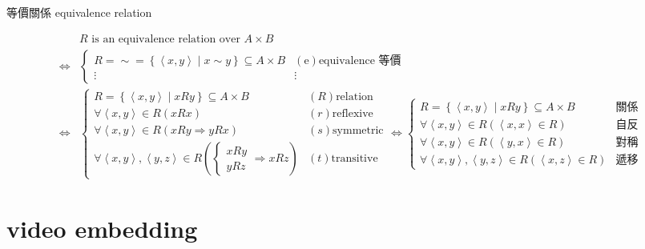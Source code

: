 \documentclass[
]{book}
\theoremstyle{definition}
\theoremstyle{definition}
\theoremstyle{definition}
\theoremstyle{definition}
\theoremstyle{remark}
\begin{document}
\begin{CJK}{UTF8}{bsmi}等價關係 equivalence relation \label{def:equivalence-relation}
\end{CJK}
\begin{CJK}{UTF8}{bsmi}
\begin{align*}
 & R\text{ is an equivalence relation over }A\times B\\
\Leftrightarrow & \begin{cases}
R=\sim=\left\{ \left\langle x,y\right\rangle \middle|x\sim y\right\} \subseteq A\times B & \left(\text{e}\right)\text{equivalence 等價}\\
\vdots & \vdots
\end{cases}\\
\Leftrightarrow & \begin{cases}
R=\left\{ \left\langle x,y\right\rangle \middle|xRy\right\} \subseteq A\times B & \left(R\right)\text{relation}\\
\forall\left\langle x,y\right\rangle \in R\left(xRx\right) & \left(r\right)\text{reflexive}\\
\forall\left\langle x,y\right\rangle \in R\left(xRy\Rightarrow yRx\right) & \left(s\right)\text{symmetric}\\
\forall\left\langle x,y\right\rangle ,\left\langle y,z\right\rangle \in R\left(\begin{cases}
xRy\\
yRz
\end{cases}\Rightarrow xRz\right) & \left(t\right)\text{transitive}
\end{cases}\Leftrightarrow\begin{cases}
R=\left\{ \left\langle x,y\right\rangle \middle|xRy\right\} \subseteq A\times B & \text{關係}\\
\forall\left\langle x,y\right\rangle \in R\left(\left\langle x,x\right\rangle \in R\right) & \text{自反}\\
\forall\left\langle x,y\right\rangle \in R\left(\left\langle y,x\right\rangle \in R\right) & \text{對稱}\\
\forall\left\langle x,y\right\rangle ,\left\langle y,z\right\rangle \in R\left(\left\langle x,z\right\rangle \in R\right) & \text{遞移}
\end{cases}
\end{align*}
\end{CJK}

\section{video embedding}\label{video-embedding}
\end{document}
